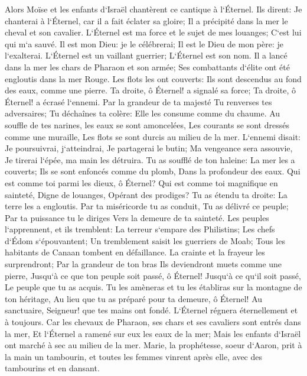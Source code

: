\verse Alors Moïse et les enfants d`Israël chantèrent ce cantique à l`Éternel. Ils dirent: Je chanterai à l`Éternel, car il a fait éclater sa gloire; Il a précipité dans la mer le cheval et son cavalier. 
\verse L`Éternel est ma force et le sujet de mes louanges; C`est lui qui m`a sauvé. Il est mon Dieu: je le célébrerai; Il est le Dieu de mon père: je l`exalterai. 
\verse L`Éternel est un vaillant guerrier; L`Éternel est son nom. 
\verse Il a lancé dans la mer les chars de Pharaon et son armée; Ses combattants d`élite ont été engloutis dans la mer Rouge. 
\verse Les flots les ont couverts: Ils sont descendus au fond des eaux, comme une pierre. 
\verse Ta droite, ô Éternel! a signalé sa force; Ta droite, ô Éternel! a écrasé l`ennemi. 
\verse Par la grandeur de ta majesté Tu renverses tes adversaires; Tu déchaînes ta colère: Elle les consume comme du chaume. 
\verse Au souffle de tes narines, les eaux se sont amoncelées, Les courants se sont dressés comme une muraille, Les flots se sont durcis au milieu de la mer. 
\verse L`ennemi disait: Je poursuivrai, j`atteindrai, Je partagerai le butin; Ma vengeance sera assouvie, Je tirerai l`épée, ma main les détruira. 
\verse Tu as soufflé de ton haleine: La mer les a couverts; Ils se sont enfoncés comme du plomb, Dans la profondeur des eaux. 
\verse Qui est comme toi parmi les dieux, ô Éternel? Qui est comme toi magnifique en sainteté, Digne de louanges, Opérant des prodiges? 
\verse Tu as étendu ta droite: La terre les a engloutis. 
\verse Par ta miséricorde tu as conduit, Tu as délivré ce peuple; Par ta puissance tu le diriges Vers la demeure de ta sainteté. 
\verse Les peuples l`apprennent, et ils tremblent: La terreur s`empare des Philistins; 
\verse Les chefs d`Édom s`épouvantent; Un tremblement saisit les guerriers de Moab; Tous les habitants de Canaan tombent en défaillance. 
\verse La crainte et la frayeur les surprendront; Par la grandeur de ton bras Ils deviendront muets comme une pierre, Jusqu`à ce que ton peuple soit passé, ô Éternel! Jusqu`à ce qu`il soit passé, Le peuple que tu as acquis. 
\verse Tu les amèneras et tu les établiras sur la montagne de ton héritage, Au lieu que tu as préparé pour ta demeure, ô Éternel! Au sanctuaire, Seigneur! que tes mains ont fondé. 
\verse L`Éternel régnera éternellement et à toujours. 
\verse Car les chevaux de Pharaon, ses chars et ses cavaliers sont entrés dans la mer, Et l`Éternel a ramené sur eux les eaux de la mer; Mais les enfants d`Israël ont marché à sec au milieu de la mer. 
\verse Marie, la prophétesse, soeur d`Aaron, prit à la main un tambourin, et toutes les femmes vinrent après elle, avec des tambourins et en dansant. 

